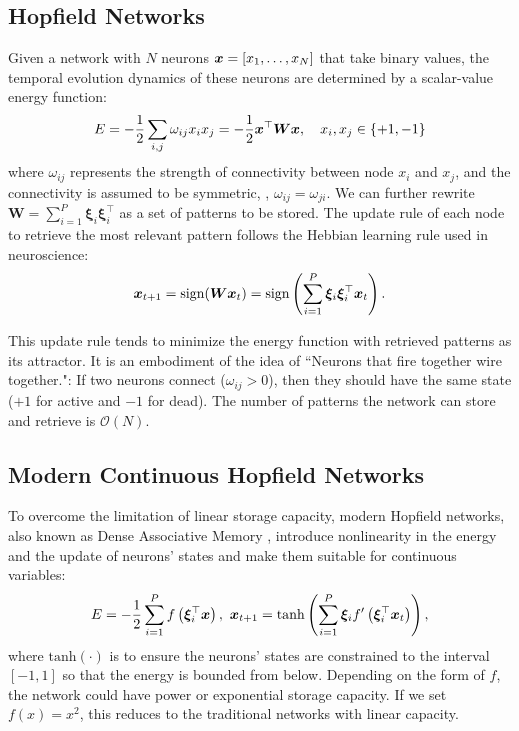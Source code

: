 \subsection{Hopfield Networks}
Given a network with $N$ neurons ${\bm{x}}=[x_1, \dots, x_N]$ that take binary values, the temporal evolution dynamics of these neurons are determined by a scalar-value energy function:
\begin{equation*}
    E = - \frac{1}{2}\sum_{i,j}\omega_{ij}x_ix_j = -\frac{1}{2}{\bm{x}}^\top\bm{W}{\bm{x}},\quad x_{i}, x_{j} \in \{+1, -1\}
\end{equation*}
where $\omega_{ij}$ represents the strength of connectivity between node $x_i$ and $x_j$, and the connectivity is assumed to be symmetric, \ie, $\omega_{ij} = \omega_{ji}$. We can further rewrite $\bm{W} =\sum_{i=1}^P \bm{\xi}_i \bm{\xi}_i^\top $ as a set of patterns to be stored. The update rule of each node to retrieve the most relevant pattern follows the Hebbian learning rule used in neuroscience: 
\begin{equation*}
    {\bm{x}}_{t+1} = \text{sign}(\bm{W}{\bm{x}}_t) = \text{sign}\left(\sum_{i=1}^P \bm{\xi}_i \bm{\xi}_i^\top{\bm{x}}_t\right).
\end{equation*}

This update rule tends to minimize the energy function with retrieved patterns as its attractor. It is an embodiment of the idea of ``Neurons that fire together wire together.": If two neurons connect ($\omega_{ij}>0$), then they should have the same state ($+1$ for active and $-1$ for dead). The number of patterns the network can store and retrieve is $\mathcal{O}(N)$.

\subsection{Modern Continuous Hopfield Networks}
To overcome the limitation of linear storage capacity, modern Hopfield networks, also known as Dense Associative Memory \citep{krotov2016dense}, introduce nonlinearity in the energy and the update of neurons' states and make them suitable for continuous variables:
\begin{equation*}
    E =  -\frac{1}{2}\sum_{i=1}^Pf\left(\bm{\xi}_i^\top\vx\right),\ 
    \vx_{t+1} = \operatorname{tanh}\left(\sum_{i=1}^P \bm{\xi}_i f'\left(\bm{\xi}_i^\top\vx_t\right)\right),
\end{equation*}
where $\operatorname{tanh(\cdot)}$ is to ensure the neurons' states are constrained to the interval $[-1,1]$ so that the energy is bounded from below. Depending on the form of $f$, the network could have power or exponential storage capacity. If we set $f(x) = x^2$, this reduces to the traditional networks with linear capacity. 

